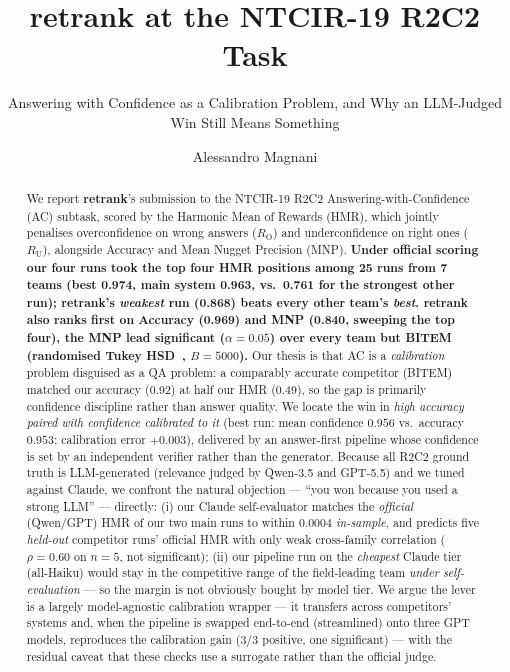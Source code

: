 \documentclass[sigconf,nonacm]{acmart}
\newcommand{\HMR}{\textsc{HMR}}
\newcommand{\MNP}{\textsc{MNP}}
\newcommand{\RO}{R_{\mathrm{O}}}
\newcommand{\RU}{R_{\mathrm{U}}}
\begin{document}
\title{retrank at the NTCIR-19 R2C2 Task}
\subtitle{Answering with Confidence as a Calibration Problem, and Why an LLM-Judged Win Still Means Something}

\author{Alessandro Magnani}

\renewcommand{\shortauthors}{Magnani}

\begin{abstract}
We report \textbf{retrank}'s submission to the NTCIR-19 R2C2 Answering-with-Confidence
(AC) subtask, scored by the Harmonic Mean of Rewards (\HMR), which jointly penalises
overconfidence on wrong answers ($\RO$) and underconfidence on right ones ($\RU$),
alongside Accuracy and Mean Nugget Precision (\MNP). \textbf{Under official scoring our
four runs took the top four \HMR{} positions among 25 runs from 7 teams (best 0.974,
main system 0.963, vs.\ 0.761 for the strongest other run); retrank's \emph{weakest} run
(0.868) beats every other team's \emph{best}. retrank also ranks first on Accuracy (0.969)
and \MNP{} (0.840, sweeping the top four), the \MNP{} lead significant ($\alpha{=}0.05$)
over every team but BITEM (randomised Tukey HSD~\cite{sakai-sigtest}, $B{=}5000$).} Our thesis is that AC is a \emph{calibration}
problem disguised as a QA problem: a comparably accurate competitor (BITEM) matched our
accuracy (0.92) at half our \HMR{} (0.49), so the gap is primarily confidence discipline
rather than answer quality. We locate the win in \emph{high accuracy paired with confidence
calibrated to it} (best run: mean confidence $0.956$ vs.\ accuracy $0.953$; calibration
error $+0.003$), delivered by an
answer-first pipeline whose confidence is set by an independent verifier rather than the
generator. Because all R2C2 ground truth is LLM-generated (relevance judged by Qwen-3.5
and GPT-5.5) and we tuned against Claude, we confront the natural objection --- ``you won
because you used a strong LLM'' --- directly: (i) our Claude self-evaluator matches the
\emph{official} (Qwen/GPT) \HMR{} of our two main runs to within $0.0004$ \emph{in-sample},
and predicts five \emph{held-out} competitor runs' official \HMR{} with only weak
cross-family correlation ($\rho{=}0.60$ on $n{=}5$, not significant); (ii) our pipeline
run on the \emph{cheapest} Claude tier (all-Haiku) would stay in the competitive range of
the field-leading team \emph{under self-evaluation} --- so the margin is not obviously bought
by model tier.
We argue the lever is a
largely model-agnostic calibration wrapper --- it transfers across competitors' systems and,
when the pipeline is swapped end-to-end (streamlined) onto three GPT models, reproduces the
calibration gain (3/3 positive, one significant) --- with the residual caveat that these checks use a
surrogate rather than the official judge.
\end{abstract}
\end{document}
